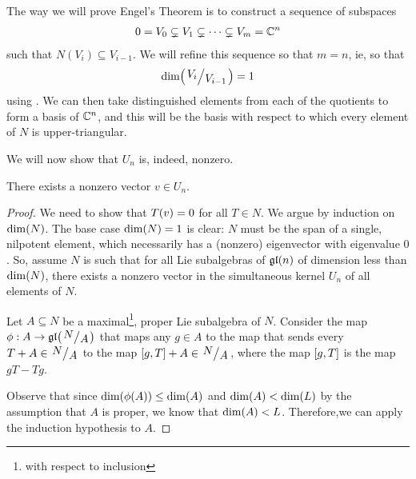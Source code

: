 
The way we will prove Engel's Theorem is to construct a sequence of subspaces
\begin{align*}
    0 = V_0 \subsetneq V_1 \subsetneq \cdots \subsetneq V_m = \mathbb{C}^n
\end{align*}
such that $N(V_i) \subseteq V_{i - 1}$. We will refine this sequence so that $m = n$, ie, so that
\begin{align*}
    \pdim{\quotient{V_{i}}{V_{i - 1}}} = 1
\end{align*}
using . We can then take distinguished elements from each of the quotients to form a basis of $\mathbb{C}^n$, and this will be the basis with respect to which every element of $N$ is upper-triangular.

We will now show that $U_n$ is, indeed, nonzero.

\begin{lemma}
    There exists a nonzero vector $v \in U_n$.
\end{lemma}
\begin{proof}
    We need to show that $T\!\left( v \right) = 0$ for all $T \in N$. We argue by induction on $\dim\!\left( N \right)$. The base case $\dim\!\left( N \right) = 1$ is clear: $N$ must be the span of a single, nilpotent element, which necessarily has a (nonzero) eigenvector with eigenvalue $0$. So, assume $N$ is such that for all Lie subalgebras of $\mathfrak{gl}\!\left( n \right)$ of dimension less than $\dim\!\left( N \right)$, there exists a nonzero vector in the simultaneous kernel $U_n$ of all elements of $N$.
    
    Let $A \subseteq N$ be a maximal\footnote{with respect to inclusion}, proper Lie subalgebra of $N$. Consider the map $\phi : A \to \gl{\quotient{N}{A}}$ that maps any $g \in A$ to the map that sends every $T + A \in \quotient{N}{A}$ to the map $\brac{g, T} + A \in \quotient{N}{A}$, where the map $\left[ g, T \right]$ is the map $gT - Tg$. %

    Observe that since $\dim\!\left( \phi\!\left( A \right) \right) \leq \dim\!\left( A \right)$ and $\dim\!\left( A \right) < \dim\!\left( L \right)$ by the assumption that $A$ is proper, we know that $\dim\!\left( A \right) < L$. Therefore,we can apply the induction hypothesis to $A$.
    \sorry
\end{proof}


